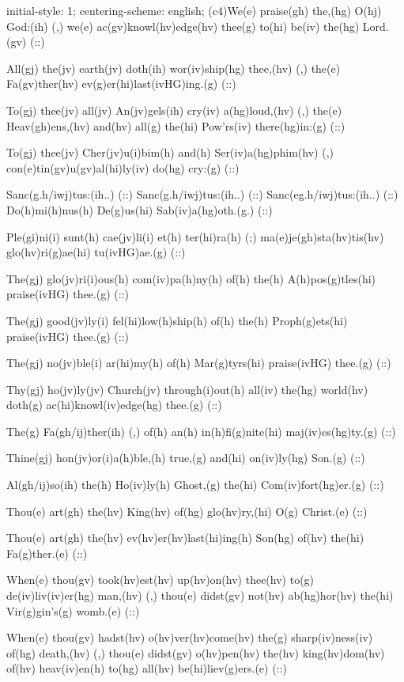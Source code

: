 initial-style: 1;
centering-scheme: english;
(c4)We(e) praise(gh) the,(hg) O(hj) God:(ih) (,) we(e) ac(gv)knowl(hv)edge(hv) thee(g) to(hi) be(iv) the(hg) Lord.(gv) (::) 

All(gj) the(jv) earth(jv) doth(ih) wor(iv)ship(hg) thee,(hv) (,) the(e) Fa(gv)ther(hv) ev(g)er(hi)last(ivHG)ing.(g) (::)

To(gj) thee(jv) all(jv) An(jv)gels(ih) cry(iv) a(hg)loud,(hv) (,) the(e) Heav(gh)ens,(hv) and(hv) all(g) the(hi) Pow'rs(iv) there(hg)in:(g) (::)

To(gj) thee(jv) Cher(jv)u(i)bim(h) and(h) Ser(iv)a(hg)phim(hv) (,) con(e)tin(gv)u(gv)al(hi)ly(iv) do(hg) cry:(g) (::)

Sanc(g.h/iwj)tus:(ih..) (::) Sanc(g.h/iwj)tus:(ih..) (::) Sanc(eg.h/iwj)tus:(ih..) (::) Do(h)mi(h)nus(h) De(g)us(hi) Sab(iv)a(hg)oth.(g.) (::)

Ple(gi)ni(i) sunt(h) cae(jv)li(i) et(h) ter(hi)ra(h) (;) ma(e)je(gh)sta(hv)tis(hv) glo(hv)ri(g)ae(hi) tu(ivHG)ae.(g) (::)

The(gj) glo(jv)ri(i)ous(h) com(iv)pa(h)ny(h) of(h) the(h) A(h)pos(g)tles(hi) praise(ivHG) thee.(g) (::)

The(gj) good(jv)ly(i) fel(hi)low(h)ship(h) of(h) the(h) Proph(g)ets(hi) praise(ivHG) thee.(g) (::)

The(gj) no(jv)ble(i) ar(hi)my(h) of(h) Mar(g)tyrs(hi) praise(ivHG) thee.(g) (::)

Thy(gj) ho(jv)ly(jv) Church(jv) through(i)out(h) all(iv) the(hg) world(hv) doth(g) ac(hi)knowl(iv)edge(hg) thee.(g) (::)

The(g) Fa(gh/ij)ther(ih) (,) of(h) an(h) in(h)fi(g)nite(hi) maj(iv)es(hg)ty.(g) (::)

Thine(gj) hon(jv)or(i)a(h)ble,(h) true,(g) and(hi) on(iv)ly(hg) Son.(g) (::)

Al(gh/ij)so(ih) the(h) Ho(iv)ly(h) Ghost,(g) the(hi) Com(iv)fort(hg)er.(g) (::)

Thou(e) art(gh) the(hv) King(hv) of(hg) glo(hv)ry,(hi) O(g) Christ.(e) (::)

Thou(e) art(gh) the(hv) ev(hv)er(hv)last(hi)ing(h) Son(hg) of(hv) the(hi) Fa(g)ther.(e) (::)

When(e) thou(gv) took(hv)est(hv) up(hv)on(hv) thee(hv) to(g) de(iv)liv(iv)er(hg) man,(hv) (,) thou(e) didst(gv) not(hv) ab(hg)hor(hv) the(hi) Vir(g)gin's(g) womb.(e) (::)

When(e) thou(gv) hadst(hv) o(hv)ver(hv)come(hv) the(g) sharp(iv)ness(iv) of(hg) death,(hv) (,) thou(e) didst(gv) o(hv)pen(hv) the(hv) king(hv)dom(hv) of(hv) heav(iv)en(h) to(hg) all(hv) be(hi)liev(g)ers.(e) (::)

